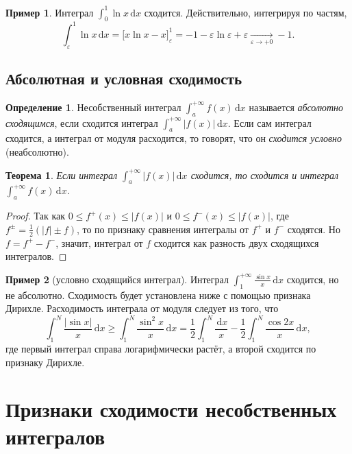 \documentclass[12pt,a4paper]{article}
\newtheorem{theorem}{Теорема}[section]
\theoremstyle{definition}
\newtheorem{definition}{Определение}[section]
\newtheorem{example}{Пример}[section]
\newcommand{\dd}{\,\mathrm{d}}
\newcommand{\eps}{\varepsilon}
\begin{document}
\begin{example}
Интеграл $\displaystyle\int_0^1\ln x\dd x$ сходится. Действительно, интегрируя по частям,
\[
\int_\eps^1\ln x\dd x = \bigl[x\ln x - x\bigr]_\eps^1 = -1 - \eps\ln\eps + \eps \xrightarrow[\eps\to+0]{} -1.
\]
\end{example}

\subsection{Абсолютная и условная сходимость}

\begin{definition}
Несобственный интеграл $\displaystyle\int_a^{+\infty}f(x)\dd x$ называется \emph{абсолютно сходящимся}, если сходится интеграл $\displaystyle\int_a^{+\infty}|f(x)|\dd x$. Если сам интеграл сходится, а интеграл от модуля расходится, то говорят, что он \emph{сходится условно} (неабсолютно).
\end{definition}

\begin{theorem}\label{th:abs_conv}
Если интеграл $\displaystyle\int_a^{+\infty}|f(x)|\dd x$ сходится, то сходится и интеграл $\displaystyle\int_a^{+\infty}f(x)\dd x$.
\end{theorem}

\begin{proof}
Так как $0\le f^+(x)\le|f(x)|$ и $0\le f^-(x)\le|f(x)|$, где $f^\pm=\frac12(|f|\pm f)$, то по признаку сравнения %
 интегралы от $f^+$ и $f^-$ сходятся. Но $f=f^+-f^-$, значит, интеграл от $f$ сходится как разность двух сходящихся интегралов.
\end{proof}

\begin{example}[условно сходящийся интеграл]
Интеграл $\displaystyle\int_1^{+\infty}\frac{\sin x}{x}\dd x$ сходится, но не абсолютно. Сходимость будет установлена ниже с помощью признака Дирихле. Расходимость интеграла от модуля следует из того, что
\[
\int_1^N\frac{|\sin x|}{x}\dd x \ge \int_1^N\frac{\sin^2 x}{x}\dd x = \frac12\int_1^N\frac{\dd x}{x} - \frac12\int_1^N\frac{\cos 2x}{x}\dd x,
\]
где первый интеграл справа логарифмически растёт, а второй сходится по признаку Дирихле.
\end{example}

\section{Признаки сходимости несобственных интегралов}\label{sec:priznaki}
\end{document}
